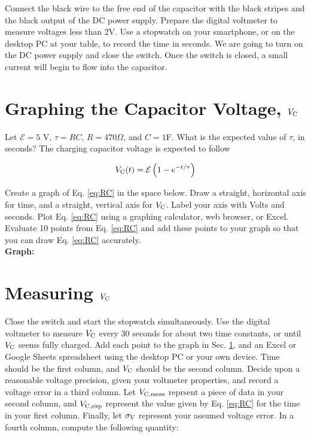 \documentclass[12pt]{article}
\begin{document}
Connect the black wire to the free end of the capacitor with the black stripes and the black output of the DC power supply.  Prepare the digital voltmeter to measure voltages less than 2V.  Use a stopwatch on your smartphone, or on the desktop PC at your table, to record the time in seconds.  We are going to turn on the DC power supply and close the switch.  Once the switch is closed, a small current will begin to flow into the capacitor.

\section{Graphing the Capacitor Voltage, $V_{\rm C}$}
\label{sec:graph}

Let $\mathcal{E} = 5$ V, $\tau = RC$, $R = 470 \Omega$, and $C = 1$F.  What is the expected value of $\tau$, in seconds?  The charging capacitor voltage is expected to follow

\begin{equation}
V_{\rm C}(t) = \mathcal{E}\left(1 - e^{-t/\tau}\right) \label{eq:RC}
\end{equation}

\noindent
Create a graph of Eq. \ref{eq:RC} in the space below.  Draw a straight, horizontal axis for time, and a straight, vertical axis for $V_{\rm C}$.  Label your axis with Volts and seconds.  Plot Eq. \ref{eq:RC} using a graphing calculator, web browser, or Excel.  Evaluate 10 points from Eq. \ref{eq:RC} and add these points to your graph so that you can draw Eq. \ref{eq:RC} accurately. \\

\noindent
\textbf{Graph:}
\vspace{5cm}

\section{Measuring $V_{\rm C}$}

\noindent
Close the switch and start the stopwatch simultaneously.  Use the digital voltmeter to measure $V_{\rm C}$ every 30 seconds for about two time constants, or until $V_{\rm C}$ seems fully charged.  Add each point to the graph in Sec. \ref{sec:graph}, and an Excel or Google Sheets spreadsheet using the desktop PC or your own device.  Time should be the first column, and $V_{\rm C}$ should be the second column.  Decide upon a reasonable voltage precision, given your voltmeter properties, and record a voltage error in a third column.  Let $V_{\rm C,meas}$ reprsent a piece of data in your second column, and $V_{\rm C,exp}$ represent the value given by Eq. \ref{eq:RC} for the time in your first column.  Finally, let $\sigma_{\rm V}$ represent your assumed voltage error.  In a fourth column, compute the following quantity:
\end{document}

